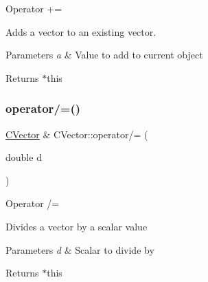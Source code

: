 Operator +=

Adds a vector to an existing vector.


\begin{DoxyCode}{0}
\end{DoxyCode}
 
\begin{DoxyParams}{Parameters}
{\em a} & Value to add to current object \\
\hline
\end{DoxyParams}
\begin{DoxyReturn}{Returns}
$\ast$this 
\end{DoxyReturn}
\mbox{\label{class_c_vector_ae14a09fe402abf99e4a2f954bf7d153c}} 
\subsubsection{\texorpdfstring{operator/=()}{operator/=()}}
{\footnotesize\ttfamily \mbox{\hyperlink{class_c_vector}{C\+Vector}} \& C\+Vector\+::operator/= (\begin{DoxyParamCaption}\item[{double}]{d }\end{DoxyParamCaption})}

Operator /=

Divides a vector by a scalar value


\begin{DoxyCode}{0}
\end{DoxyCode}
 
\begin{DoxyParams}{Parameters}
{\em d} & Scalar to divide by \\
\hline
\end{DoxyParams}
\begin{DoxyReturn}{Returns}
$\ast$this 
\end{DoxyReturn}
\mbox{\label{class_c_vector_a0d188ac1b8da71257bea3854d7f1f6b7}} 
